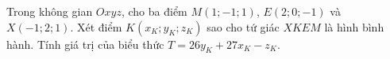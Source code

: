 \begin{ex}
Trong không gian $Oxyz$, cho ba điểm $M(1;-1;1)$, $E(2;0;-1)$ và $X(-1;2;1)$. Xét điểm $K(x_K;y_K;z_K)$ sao cho tứ giác $XKEM$ là hình bình hành. Tính giá trị của biểu thức $T=26y_K+27x_K-z_K$.
\end{ex}
